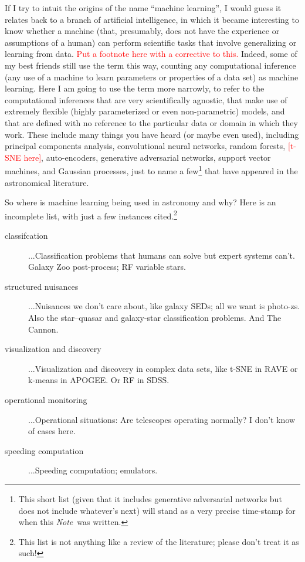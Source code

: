 \documentclass[12pt, twoside, letterpaper]{article}
\newcommand{\documentname}{\textsl{Note}}
\newcommand{\todo}[1]{\textcolor{red}{#1}}  %
\begin{document}
If I try to intuit the origins of the name ``machine learning'',
I would guess it relates back to a branch of artificial intelligence,
in which it became interesting to know whether a machine (that,
presumably, does not have the experience or assumptions of a human)
can perform scientific tasks that involve generalizing or learning from
data. \todo{Put a footnote here with a corrective to this.}
Indeed, some of my best friends still use the term
this way, counting any computational inference (any use of a machine
to learn parameters or properties of a data set) as machine learning.
Here I am going to use the term more narrowly, to refer to the computational
inferences that are very scientifically agnostic, that make use of extremely
flexible (highly parameterized or even non-parametric) models, and
that are defined with no reference to the particular data or domain in
which they work.
These include many things you have heard (or maybe even used),
including principal components analysis, convolutional neural
networks, random forests, \todo{[t-SNE here]}, auto-encoders,
generative adversarial networks, support vector machines,
and Gaussian processes,
just to name a few\footnote{This short list (given
  that it includes generative adversarial networks but does not
  include whatever's next) will stand as a very precise time-stamp for
  when this \documentname\ was written.}
that have appeared in the astronomical literature.

So where is machine learning being used in astronomy and why?  Here is
an incomplete list, with just a few instances cited.\footnote{This
  list is not anything like a review of the literature; please don't
  treat it as such!}
\begin{description}
\item[classifcation]
...Classification problems that humans can solve but expert systems
can't. Galaxy Zoo post-process; RF variable stars.
\item[structured nuisances]
...Nuisances we don't care about, like galaxy SEDs; all we want is
photo-zs. Also the star--quasar and galaxy-star classification
problems. And The Cannon.
\item[visualization and discovery]
...Visualization and discovery in complex data sets, like t-SNE in RAVE
or k-means in APOGEE. Or RF in SDSS.
\item[operational monitoring]
...Operational situations: Are telescopes operating normally? I don't know
of cases here.
\item[speeding computation]
...Speeding computation; emulators.
\end{description}
\end{document}
